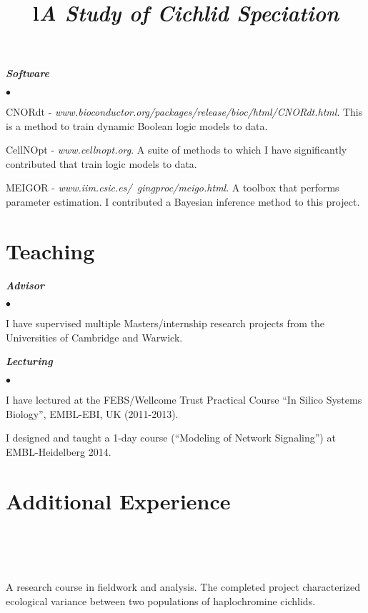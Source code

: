 \documentclass[overlapped, line, 11pt, letterpaper]{res}
\renewenvironment{itemize}{
\begin{list}{$\bullet$}
{\setlength{\itemsep}{0cm}}
}{\end{list}}
\begin{document}
\begin{resume}
\textbf{\emph{Software}}
\begin{itemize}
\item CNORdt - \emph{www.bioconductor.org/packages/release/bioc/html/CNORdt.html}. This is a method to train dynamic Boolean logic models to data.
\item CellNOpt - \emph{www.cellnopt.org}. A suite of methods to which I have significantly contributed that train logic models to data.
\item MEIGOR - \emph{www.iim.csic.es/~gingproc/meigo.html}. A toolbox that performs parameter estimation. I contributed a Bayesian inference method to this project.
\end{itemize}

\section{\bf Teaching}
\textbf{\emph{Advisor}}
\begin{itemize}
\item I have supervised multiple Masters/internship research projects from the Universities of Cambridge and Warwick. 
\end{itemize}
\textbf{\emph{Lecturing}}
\begin{itemize}
\item I have lectured at the FEBS/Wellcome Trust Practical Course ``In Silico Systems Biology'', EMBL-EBI, UK (2011-2013).
\item I designed and taught a 1-day course (``Modeling of Network Signaling'') at EMBL-Heidelberg 2014.
\end{itemize}

\section{\bf Additional Experience}
\begin{formatb}
\title{l} \\
\\
\body\\
\end{formatb}

\title{\it A Study of Cichlid Speciation} 
\begin{position}
A research course in fieldwork and analysis. The completed project characterized ecological variance between two populations of haplochromine cichlids.
\end{position}


\end{resume}
\end{document}
